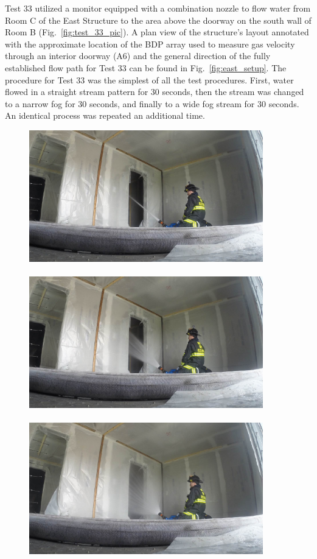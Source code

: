 \documentclass[12pt,oneside]{book}
\begin{document}
Test 33 utilized a monitor equipped with a combination nozzle to flow water from Room C of the East Structure to the area above the doorway on the south wall of Room B (Fig.~\ref{fig:test_33_pic}). A plan view of the structure's layout annotated with the approximate location of the BDP array used to measure gas velocity through an interior doorway (A6) and the general direction of the fully established flow path for Test 33 can be found in Fig.~\ref{fig:east_setup}. The procedure for Test 33 was the simplest of all the test procedures. First, water flowed in a straight stream pattern for 30 seconds, then the stream was changed to a narrow fog for 30 seconds, and finally to a wide fog stream for 30 seconds. An identical process was repeated an additional time.

\begin{figure}[!ht]
\includegraphics[trim=16cm 6.25cm 9cm 6cm, clip=true, width=4in]{../Pictures/SS_Room_B_Test_33}
\\~\\
\includegraphics[trim=16cm 6.25cm 9cm 6cm, clip=true, width=4in]{../Pictures/NF_Room_B_Test_33}
\\~\\
\includegraphics[trim=16cm 6.25cm 9cm 6cm, clip=true, width=4in]{../Pictures/WF_Room_B_Test_33}

\end{figure}
\end{document}
